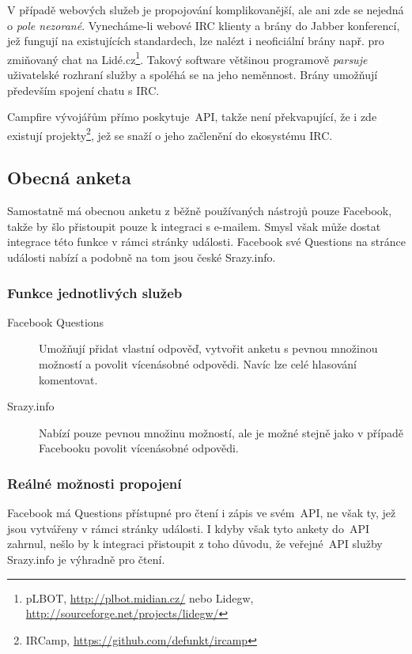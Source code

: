 \documentclass[12pt,oneside,final]{fithesis2}
\begin{document}
V případě webových služeb je propojování komplikovanější, ale ani zde se nejedná o \emph{pole nezorané}. Vynecháme-li webové IRC klienty a brány do Jabber konferencí, jež fungují na existujících standardech, lze nalézt i neoficiální brány např. pro zmiňovaný chat na Lidé.cz\footnote{pLBOT, \url{http://plbot.midian.cz/} nebo Lidegw, \url{http://sourceforge.net/projects/lidegw/}}. Takový software většinou programově \emph{parsuje} uživatelské rozhraní služby a spoléhá se na jeho neměnnost. Brány umožňují především spojení chatu s IRC.

Campfire vývojářům přímo poskytuje~API, takže není překvapující, že i zde existují projekty\footnote{IRCamp, \url{https://github.com/defunkt/ircamp}}, jež se snaží o jeho začlenění do ekosystému IRC.

\subsection{Obecná anketa}\label{genericPoll}
Samostatně má obecnou anketu z běžně používaných nástrojů pouze Facebook, takže by šlo přistoupit pouze k integraci s e-mailem. Smysl však může dostat integrace této funkce v rámci stránky události. Facebook své Questions na stránce události nabízí a podobně na tom jsou české Srazy.info.

\subsubsection*{Funkce jednotlivých služeb}
\begin{description}
    \item[Facebook Questions]
        Umožňují přidat vlastní odpověď, vytvořit anketu s pevnou množinou možností a povolit vícenásobné odpovědi. Navíc lze celé hlasování komentovat.

    \item[Srazy.info]
        Nabízí pouze pevnou množinu možností, ale je možné stejně jako v případě Facebooku povolit vícenásobné odpovědi.
\end{description}

\subsubsection*{Reálné možnosti propojení}
Facebook má Questions přístupné pro čtení i zápis ve svém~API, ne však ty, jež jsou vytvářeny v rámci stránky události. I kdyby však tyto ankety do~API zahrnul, nešlo by k integraci přistoupit z toho důvodu, že veřejné~API služby Srazy.info je výhradně pro čtení.
\end{document}
